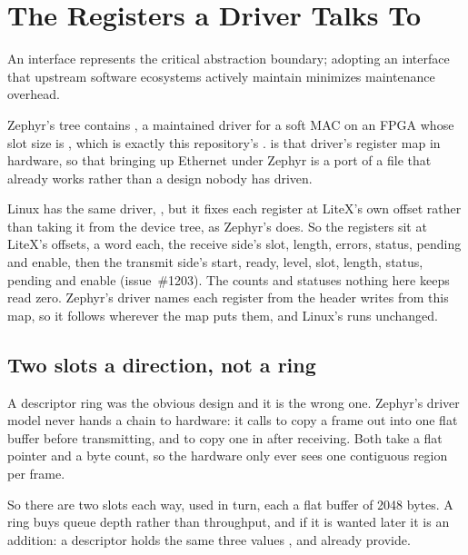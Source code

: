 \section{The Registers a Driver Talks To}
\label{sec:x-ethslots}

An interface represents the critical abstraction boundary; adopting an
interface that upstream software ecosystems actively maintain minimizes
maintenance overhead.

Zephyr's tree contains ,
a maintained driver for a soft MAC on an FPGA whose slot size is
, which is exactly this repository's .
 is that driver's register map in hardware, so that
bringing up Ethernet under Zephyr is a port of a file that already
works rather than a design nobody has driven.

Linux has the same driver, , but it fixes each
register at LiteX's own offset rather than taking it from the device
tree, as Zephyr's does. So the registers sit at LiteX's offsets, a word
each, the receive side's slot, length, errors, status, pending and
enable, then the transmit side's start, ready, level, slot, length,
status, pending and enable (issue~\#1203). The counts and statuses
nothing here keeps read zero. Zephyr's driver names each register from
the header  writes from this map, so it follows
wherever the map puts them, and Linux's runs unchanged.

\subsection{Two slots a direction, not a ring}

A descriptor ring was the obvious design and it is the wrong one.
Zephyr's driver model never hands a chain to hardware: it calls
 to copy a frame out into one
flat buffer before transmitting, and  to copy one in after receiving. Both take a flat pointer and a
byte count, so the hardware only ever sees one contiguous region per
frame.

So there are two slots each way, used in turn, each a flat buffer of
2048 bytes. A ring buys queue depth rather than throughput, and if it
is wanted later it is an addition: a descriptor holds the same
three values ,  and 
already provide.

